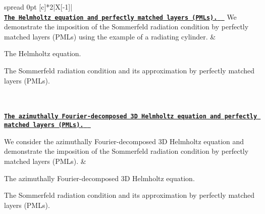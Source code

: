 \tabulinesep=1mm
\begin{longtabu} spread 0pt [c]{*{2}{|X[-1]}|}
\hline
{}\\
\href{../../pml_helmholtz/scattering/html/index.html}{\tt {\bfseries The Helmholtz equation and perfectly matched layers (P\+M\+Ls). } } We demonstrate the imposition of the Sommerfeld radiation condition by perfectly matched layers (P\+M\+Ls) using the example of a radiating cylinder.  &
\begin{DoxyItemize}
\item The Helmholtz equation.
\item The Sommerfeld radiation condition and its approximation by perfectly matched layers (P\+M\+Ls). 
\end{DoxyItemize}

\\
\\
\href{../../pml_fourier_decomposed_helmholtz/oscillating_sphere/html/index.html}{\tt {\bfseries The azimuthally Fourier-\/decomposed 3D Helmholtz equation and perfectly matched layers (P\+M\+Ls). } }

We consider the azimuthally Fourier-\/decomposed 3D Helmholtz equation and demonstrate the imposition of the Sommerfeld radiation condition by perfectly matched layers (P\+M\+Ls).  &
\begin{DoxyItemize}
\item The azimuthally Fourier-\/decomposed 3D Helmholtz equation.
\item The Sommerfeld radiation condition and its approximation by perfectly matched layers (P\+M\+Ls). 
\end{DoxyItemize}




\end{longtabu}
